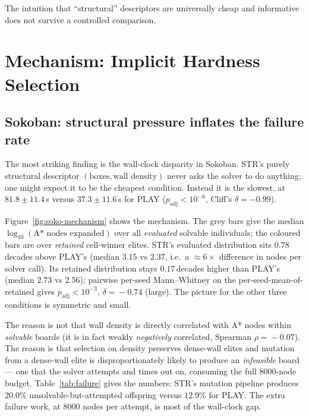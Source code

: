 \documentclass[conference]{IEEEtran}
\begin{document}
The intuition that ``structural'' descriptors are universally cheap
and informative does not survive a controlled comparison.

\section{Mechanism: Implicit Hardness Selection}
\label{sec:mechanism}

\subsection{Sokoban: structural pressure inflates the failure rate}

The most striking finding is the wall-clock disparity in Sokoban.
\textsf{STR}'s purely structural descriptor $(\text{boxes},
\text{wall density})$ never asks the solver to do anything; one
might expect it to be the cheapest condition. Instead it is the
slowest, at $81.8\pm11.4$\,s versus $37.3\pm11.6$\,s for
\textsf{PLAY} ($p_\text{adj}\!<\!10^{-6}$, Cliff's $\delta=-0.99$).

Figure~\ref{fig:soko-mechanism} shows the mechanism. The grey
bars give the median $\log_{10}(\text{A* nodes expanded})$ over all
\emph{evaluated} solvable individuals; the coloured bars are over
\emph{retained} cell-winner elites. \textsf{STR}'s evaluated
distribution sits $0.78$\,decades above \textsf{PLAY}'s (median
$3.15$ vs $2.37$, i.e.\ a $\approx\!6\times$ difference in nodes
per solver call). Its retained distribution stays
$0.17$\,decades higher than \textsf{PLAY}'s (median $2.73$ vs
$2.56$); pairwise per-seed Mann--Whitney on the
per-seed-mean-of-retained gives $p_\text{adj}\!<\!10^{-3}$,
$\delta\!=\!-0.74$ (large).
The picture for the other three conditions is symmetric and small.

The reason is not that wall density is directly correlated with A*
nodes within \emph{solvable} boards (it is in fact weakly
\emph{negatively} correlated, Spearman
$\rho\!=\!-0.07$). The reason is that selection on density
preserves dense-wall elites and mutation from a dense-wall elite is
disproportionately likely to produce an
\emph{infeasible} board --- one that the solver attempts and times
out on, consuming the full $8000$-node budget. Table~\ref{tab:failure}
gives the numbers: \textsf{STR}'s mutation pipeline produces
$20.0\%$ unsolvable-but-attempted offspring versus $12.9\%$ for
\textsf{PLAY}. The extra failure work, at $8000$ nodes per attempt,
is most of the wall-clock gap.
\end{document}
